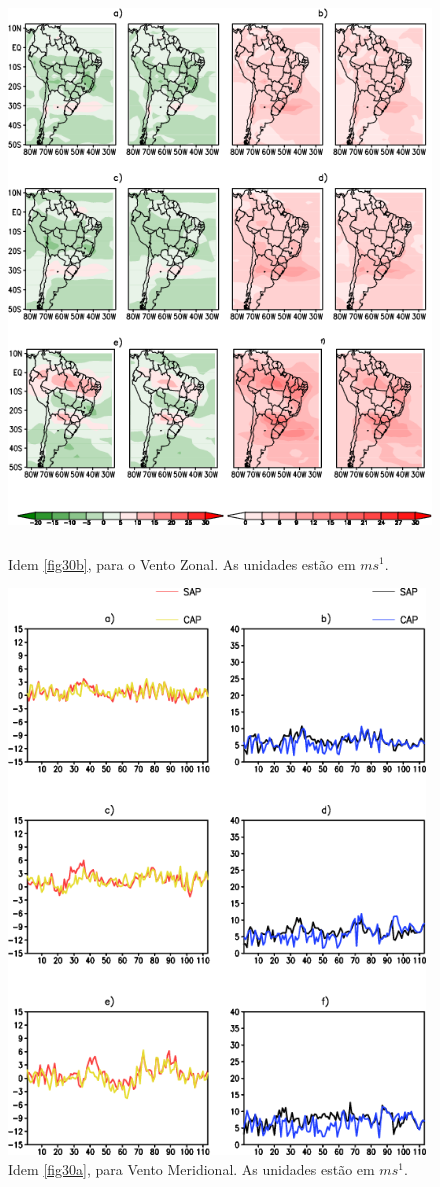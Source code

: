 \begin{figure}[!hbp]
\centering
\includegraphics[height=15cm]{./figs/campo_vies_eqm-uvel.png}
\caption{Idem \autoref{fig30b}, para o Vento Zonal. As unidades estão em $ms^{1}$.}
\label{fig32b}
\end{figure}

\begin{figure}[!hbp]
\centering
\includegraphics[height=15cm]{./figs/vies_eqm-vvel.png}
\caption{Idem \autoref{fig30a}, para Vento Meridional. As unidades estão em $ms^{1}$.}
\label{fig33a}
\end{figure}


